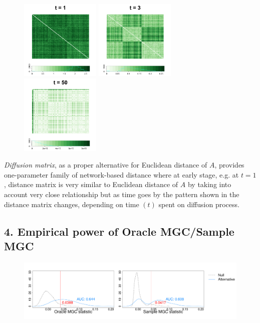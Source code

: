 \documentclass[12pt]{article}
\begin{document}
\begin{figure}[H]
	\centering
	\includegraphics[width=1.5in]{../Figure/Dx1.png}
	\includegraphics[width=1.5in]{../Figure/Dx3.png}
	\includegraphics[width=1.5in]{../Figure/Dx50.png}
	\label{fig:diffusions}
\end{figure}	

\textit{Diffusion matrix}, as a proper alternative for Euclidean distance of $A$, provides one-parameter family of network-based distance where at early stage, e.g. at $t=1$, distance matrix is very similar to Euclidean distance of $A$ by taking into account very close relationship but as time goes by the pattern shown in the distance matrix changes, depending on time $(t)$ spent on diffusion process. 

\subsection*{4. Empirical power of Oracle MGC/Sample MGC}

\begin{figure}[H]
	\centering
	\includegraphics[width=6in]{../Figure/density.pdf}
	\label{fig:density}
\end{figure}	
 
\end{document}
